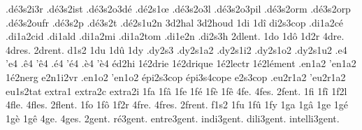 {                    .dé3s2i3r
                    .dé3s2ist
                    .dé3s2o3dé
                    .dé2s1œ
                    .dé3s2o3l
                    .dé3s2o3pil
                    .dé3s2orm
                    .dé3s2orp
                    .dé3s2oufr
                    .dé3s2p %
                    .dé3s2t %
                    .dé2s1u2n
                    3d2hal
                    3d2houd
1di
1dî
                    di2s3cop
                    .di1a2cé
                    .di1a2cid
                    .di1ald
                    .di1a2mi
                    .di1a2tom
                    .di1e2n
                    .di2s3h
2dlent. %
1do
1dô
1d2r
4dre.
4dres.
2drent. %
d1s2
1du
1dû
1dy
                    .dy2s3
                    .dy2s1a2
                    .dy2s1i2
                    .dy2s1o2 %
                    .dy2s1u2
.e4
'e4
.ê4
'ê4
.é4
'é4
.è4
'è4
éd2hi %
                    1é2drie
                    1é2drique
                    1é2lectr
                    1é2lément
                    .en1a2
                    'en1a2
                    1é2nerg
                    e2n1i2vr
                    .en1o2
                    'en1o2
                    épi2s3cop
                    épi3s4cope
                    e2s3cop
                    .eu2r1a2
                    'eu2r1a2
                    eu1s2tat
                    extra1
                    extra2c
                    extra2i
1fa
1fâ
1fe
1fé
1fè
1fê
4fe.
4fes.
2fent. %
%
1fi
1fî
1f2l
4fle.
4fles.
2flent. %
1fo
1fô
1f2r
4fre.
4fres.
2frent. %
f1s2
1fu
1fû
1fy
1ga
1gâ
1ge
1gé
1gè
1gê
4ge.
4ges.
       2gent.
     ré3gent.
  entre3gent.
   indi3gent.
   dili3gent.
intelli3gent.
}
